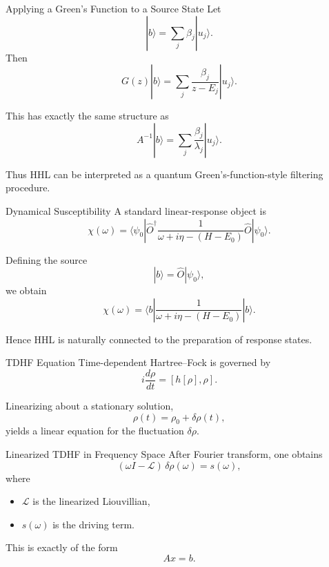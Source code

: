 \documentclass{beamer}
\begin{document}

\begin{frame}{Applying a Green's Function to a Source State}
Let
\[
|b\rangle = \sum_j \beta_j |u_j\rangle.
\]
Then
\[
G(z)|b\rangle
=
\sum_j \frac{\beta_j}{z-E_j}|u_j\rangle.
\]

This has exactly the same structure as
\[
A^{-1}|b\rangle
=
\sum_j \frac{\beta_j}{\lambda_j}|u_j\rangle.
\]

Thus HHL can be interpreted as a quantum Green's-function-style filtering procedure.
\end{frame}


\begin{frame}{Dynamical Susceptibility}
A standard linear-response object is
\[
\chi(\omega)
=
\langle \psi_0|
\hat{O}^\dagger
\frac{1}{\omega+i\eta-(H-E_0)}
\hat{O}
|\psi_0\rangle.
\]

Defining the source
\[
|b\rangle = \hat{O}|\psi_0\rangle,
\]
we obtain
\[
\chi(\omega)=
\langle b|
\frac{1}{\omega+i\eta-(H-E_0)}
|b\rangle.
\]

Hence HHL is naturally connected to the preparation of response states.
\end{frame}



\begin{frame}{TDHF Equation}
Time-dependent Hartree--Fock is governed by
\[
i \frac{d\rho}{dt} = [h[\rho],\rho].
\]

Linearizing about a stationary solution,
\[
\rho(t)=\rho_0+\delta\rho(t),
\]
yields a linear equation for the fluctuation \(\delta\rho\).
\end{frame}


\begin{frame}{Linearized TDHF in Frequency Space}
After Fourier transform, one obtains
\[
(\omega I-\mathcal{L})\,\delta\rho(\omega)=s(\omega),
\]
where
\begin{itemize}
\item \(\mathcal{L}\) is the linearized Liouvillian,
\item \(s(\omega)\) is the driving term.
\end{itemize}

This is exactly of the form
\[
Ax=b.
\]
\end{frame}

\end{document}
